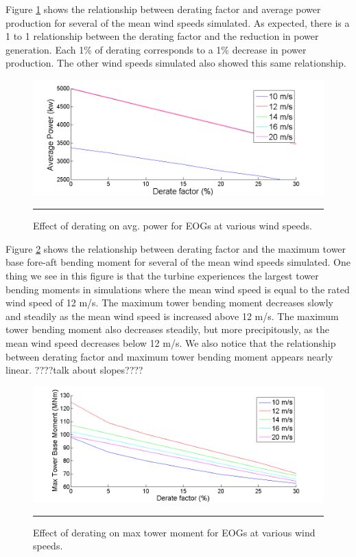 Figure \ref{fig4-5} shows the relationship between derating factor and average power production for several of the mean wind speeds simulated. As expected, there is a 1 to 1 relationship between the derating factor and the reduction in power generation. Each 1\% of derating corresponds to a 1\% decrease in power production. The other wind speeds simulated also showed this same relationship.

\begin{figure}[htbp]
	\centering
		\includegraphics[trim = {1cm 0 2cm 0}, clip, width = \linewidth]{Figures/ch4Figures/fig4-5.png}
		\rule{35em}{0.5pt}
	\caption{Effect of derating on avg. power for EOGs at various wind speeds.}
	\label{fig4-5}
\end{figure}

Figure \ref{fig4-6} shows the relationship between derating factor and the maximum tower base fore-aft bending moment for several of the mean wind speeds simulated. One thing we see in this figure is that the turbine experiences the largest tower bending moments in simulations where the mean wind speed is equal to the rated wind speed of 12 m/s. The maximum tower bending moment decreases slowly and steadily as the mean wind speed is increased above 12 m/s. The maximum tower bending moment also decreases steadily, but more precipitously, as the mean wind speed decreases below 12 m/s. We also notice that the relationship between derating factor and maximum tower bending moment appears nearly linear. ????talk about slopes????

\begin{figure}[htbp]
	\centering
		\includegraphics[trim = {1cm 0 2cm 0}, clip, width = \linewidth]{Figures/ch4Figures/fig4-6.png}
		\rule{35em}{0.5pt}
	\caption{Effect of derating on max tower moment for EOGs at various wind speeds.}
	\label{fig4-6}
\end{figure}

